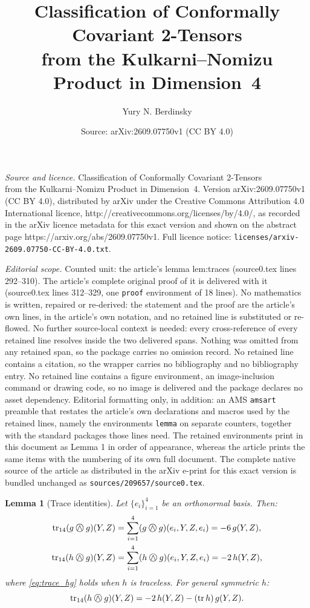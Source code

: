 \documentclass[10pt,a4paper]{amsart}
\title{Classification of Conformally Covariant 2-Tensors\\ from the Kulkarni--Nomizu Product in Dimension~4}
\author{Yury N. Berdinsky}
\date{Source: arXiv:2609.07750v1 (CC BY 4.0)}
\newtheorem{lemma}{Lemma}
\newcommand{\owedge}{\mathbin{%
  \text{%
    \ooalign{%
      \hfil$\wedge$\hfil\cr
      \hfil\raisebox{0.05em}{$\bigcirc$}\hfil\cr
    }%
  }%
}}
\begin{document}
\maketitle

\noindent\emph{Source and licence.} Classification of Conformally Covariant 2-Tensors\\ from the Kulkarni--Nomizu Product in Dimension~4. Version arXiv:2609.07750v1 (CC BY 4.0), distributed by arXiv under the Creative Commons Attribution 4.0 International licence, http://creativecommons.org/licenses/by/4.0/, as recorded in the arXiv licence metadata for this exact version and shown on the abstract page https://arxiv.org/abs/2609.07750v1. Full licence notice: \texttt{licenses/arxiv-2609.07750-CC-BY-4.0.txt}.\par\smallskip

\noindent\textit{Editorial scope.} Counted unit: the article's lemma lem:traces (source0.tex lines 292--310). The article's complete original proof of it is delivered with it (source0.tex lines 312--329, one \texttt{proof} environment of 18 lines). No mathematics is written, repaired or re-derived: the statement and the proof are the article's own lines, in the article's own notation, and no retained line is substituted or re-flowed.  No further source-local context is needed: every cross-reference of every retained line resolves inside the two delivered spans.  Nothing was omitted from any retained span, so the package carries no omission record.  No retained line contains a citation, so the wrapper carries no bibliography and no bibliography entry.  No retained line contains a figure environment, an image-inclusion command or drawing code, so no image is delivered and the package declares no asset dependency.  Editorial formatting only, in addition: an AMS \texttt{amsart} preamble that restates the article's own declarations and macros used by the retained lines, namely the environments \texttt{lemma} on separate counters, together with the standard packages those lines need.  The retained environments print in this document as Lemma 1 in order of appearance, whereas the article prints the same items with the numbering of its own full document.  The complete native source of the article as distributed in the arXiv e-print for this exact version is bundled unchanged as \texttt{sources/209657/source0.tex}.
\begin{lemma}[Trace identities]
\label{lem:traces}
Let $\{e_i\}_{i=1}^4$ be an orthonormal basis. Then:
\begin{align}
  \operatorname{tr}_{14}(g \owedge g)(Y,Z)
    &= \sum_{i=1}^4 (g \owedge g)(e_i, Y, Z, e_i) = -6\,g(Y,Z),
    \label{eq:trace_gg}\\
  \operatorname{tr}_{14}(h \owedge g)(Y,Z)
    &= \sum_{i=1}^4 (h \owedge g)(e_i, Y, Z, e_i) = -2\,h(Y,Z),
    \label{eq:trace_hg}
\end{align}
where \eqref{eq:trace_hg} holds when $h$ is traceless.
For general symmetric $h$:
\begin{equation}
  \operatorname{tr}_{14}(h \owedge g)(Y,Z)
    = -2\,h(Y,Z) - (\operatorname{tr} h)\,g(Y,Z).
  \label{eq:trace_hg_general}
\end{equation}
\end{lemma}
\end{document}
